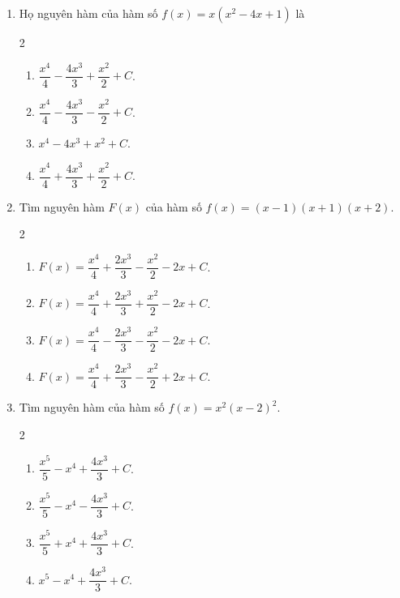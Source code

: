 \documentclass[12pt]{article}
\begin{document}
\begin{enumerate}[label=\textbf{Câu \arabic*.}]
		\item Họ nguyên hàm của hàm số $f(x) = x(x^2 - 4x + 1)$ là
		\begin{multicols}{2}
			\begin{enumerate}[label=\textbf{\Alph*.}]
				\item $\dfrac{x^4}{4} - \dfrac{4x^3}{3} + \dfrac{x^2}{2} + C$.
				\item $\dfrac{x^4}{4} - \dfrac{4x^3}{3} - \dfrac{x^2}{2} + C$.
				\item $x^4 - 4x^3 + x^2 + C$.
				\item $\dfrac{x^4}{4} + \dfrac{4x^3}{3} + \dfrac{x^2}{2} + C$.
			\end{enumerate}
		\end{multicols}
		
		\item Tìm nguyên hàm $F(x)$ của hàm số $f(x) = (x - 1)(x + 1)(x + 2)$.
		\begin{multicols}{2}
			\begin{enumerate}[label=\textbf{\Alph*.}]
				\item $F(x) = \dfrac{x^4}{4} + \dfrac{2x^3}{3} - \dfrac{x^2}{2} - 2x + C$.
				\item $F(x) = \dfrac{x^4}{4} + \dfrac{2x^3}{3} + \dfrac{x^2}{2} - 2x + C$.
				\item $F(x) = \dfrac{x^4}{4} - \dfrac{2x^3}{3} - \dfrac{x^2}{2} - 2x + C$.
				\item $F(x) = \dfrac{x^4}{4} + \dfrac{2x^3}{3} - \dfrac{x^2}{2} + 2x + C$.
			\end{enumerate}
		\end{multicols}
		
		\item Tìm nguyên hàm của hàm số $f(x) = x^2(x - 2)^2$.
		\begin{multicols}{2}
			\begin{enumerate}[label=\textbf{\Alph*.}]
				\item $\dfrac{x^5}{5} - x^4 + \dfrac{4x^3}{3} + C$.
				\item $\dfrac{x^5}{5} - x^4 - \dfrac{4x^3}{3} + C$.
				\item $\dfrac{x^5}{5} + x^4 + \dfrac{4x^3}{3} + C$.
				\item $x^5 - x^4 + \dfrac{4x^3}{3} + C$.
			\end{enumerate}
		\end{multicols}
		

\end{enumerate}
\end{document}
